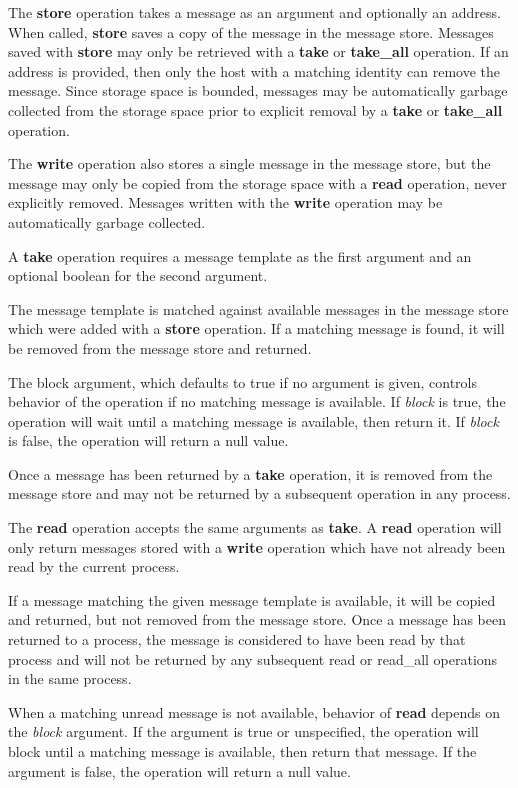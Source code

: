 The \textbf{store} operation takes a message as an argument and optionally an address. When called, \textbf{store} saves a copy of the message in the message store. Messages saved with \textbf{store} may only be retrieved with a \textbf{take} or \textbf{take\_all} operation. If an address is provided, then only the host with a matching identity can remove the message. Since storage space is bounded, messages may be automatically garbage collected from the storage space prior to explicit removal by a \textbf{take} or \textbf{take\_all} operation.

The \textbf{write} operation also stores a single message in the message store, but the message may only be copied from the storage space with a \textbf{read} operation, never explicitly removed. Messages written with the \textbf{write} operation may be automatically garbage collected.

A \textbf{take} operation requires a message template as the first argument and an optional boolean for the second argument.

The message template is matched against available messages in the message store which were added with a \textbf{store} operation. If a matching message is found, it will be removed from the message store and returned.

The block argument, which defaults to true if no argument is given, controls behavior of the operation if no matching message is available. If \textit{block} is true, the operation will wait until a matching message is available, then return it. If \textit{block} is false, the operation will return a null value.

Once a message has been returned by a \textbf{take} operation, it is removed from the message store and may not be returned by a subsequent operation in any process.

The \textbf{read} operation accepts the same arguments as \textbf{take}. A \textbf{read} operation will only return messages stored with a \textbf{write} operation which have not already been read by the current process.

If a message matching the given message template is available, it will be copied and returned, but not removed from the message store. Once a message has been returned to a process, the message is considered to have been read by that process and will not be returned by any subsequent read or read\_all operations in the same process.

When a matching unread message is not available, behavior of \textbf{read} depends on the \textit{block} argument. If the argument is true or unspecified, the operation will block until a matching message is available, then return that message. If the argument is false, the operation will return a null value.

